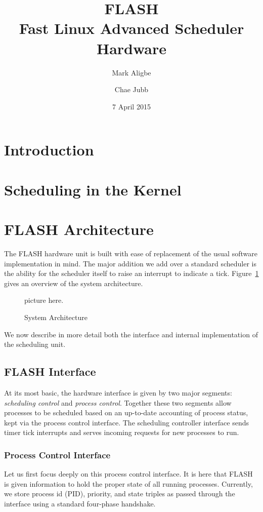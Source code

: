 \documentclass{sig-alternate-10pt}
\title{FLASH\\Fast Linux Advanced Scheduler Hardware}
\author{
	Mark Aligbe\\
	    \email{ma2799@columbia.edu}
	\and
    Chae Jubb\\
        \email{ecj2122@columbia.edu}
}
\date{7 April 2015}
\begin{document}
\maketitle

\begin{abstract}
\lipsum[1]
\end{abstract}

\section{Introduction}
\lipsum[1]

\section{Scheduling in the Kernel}
\lipsum[1]

\section{FLASH Architecture}
The FLASH hardware unit is built with ease of replacement of the usual
software implementation in mind.  The major addition we add over a standard
scheduler is the ability for the scheduler itself to raise an interrupt to
indicate a tick. Figure~\ref{fig:arch_overview} gives an overview of the
system architecture.

\begin{figure}
	\begin{center}
		picture here.
		\caption{System Architecture}
		\label{fig:arch_overview}
	\end{center}
\end{figure}

We now describe in more detail both the interface and
internal implementation of the scheduling unit.

\subsection{FLASH Interface}
At its most basic, the hardware interface is given by two major segments:
\emph{scheduling control} and \emph{process control}.  Together these two
segments allow processes to be scheduled based on an up-to-date accounting
of process status, kept via the process control interface.  The scheduling
controller interface sends timer tick interrupts and serves incoming
requests for new processes to run.

\subsubsection{Process Control Interface}
Let us first focus deeply on this process control interface.  It is here
that FLASH is given information to hold the proper state of all running
processes.  Currently, we store process id (PID), priority, and state
triples as passed through the interface using a standard four-phase
handshake.
\end{document}
